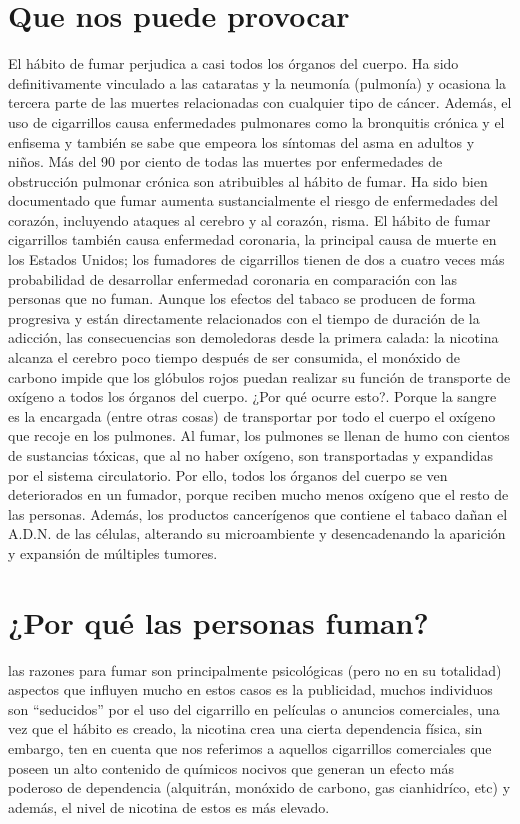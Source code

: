 \documentclass{bmcart}
\begin{document}
	\section*{Que nos puede provocar}
	El hábito de fumar perjudica a casi todos los órganos del cuerpo. Ha sido definitivamente vinculado a las cataratas y la neumonía (pulmonía) y ocasiona la tercera parte de las muertes relacionadas con cualquier tipo de cáncer. Además, el uso de cigarrillos causa enfermedades pulmonares como la bronquitis crónica y el enfisema y también se sabe que empeora los síntomas del asma en adultos y niños. Más del 90 por ciento de todas las muertes por enfermedades de obstrucción pulmonar crónica son atribuibles al hábito de fumar. Ha sido bien documentado que fumar aumenta sustancialmente el riesgo de enfermedades del corazón, incluyendo ataques al cerebro y al corazón, risma. El hábito de fumar cigarrillos también causa enfermedad coronaria, la principal causa de muerte en los Estados Unidos; los fumadores de cigarrillos tienen de dos a cuatro veces más probabilidad de desarrollar enfermedad coronaria en comparación con las personas que no fuman. Aunque los efectos del tabaco se producen de forma progresiva y están directamente relacionados con el tiempo de duración de la adicción, las consecuencias son demoledoras desde la primera calada: la nicotina alcanza el cerebro poco tiempo después de ser consumida, el monóxido de carbono impide que los glóbulos rojos puedan realizar su función de transporte de oxígeno a todos los órganos del cuerpo. ¿Por qué ocurre esto?. Porque la sangre es la encargada (entre otras cosas) de transportar por todo el cuerpo el oxígeno que recoje en los pulmones. Al fumar, los pulmones se llenan de humo con cientos de sustancias tóxicas, que al no haber oxígeno, son transportadas y expandidas por el sistema circulatorio. Por ello, todos los órganos del cuerpo se ven deteriorados en un fumador, porque reciben mucho menos oxígeno que el resto de las personas.
	Además, los productos cancerígenos que contiene el tabaco dañan el A.D.N. de las células, alterando su microambiente y desencadenando la aparición y expansión de múltiples tumores.
	
	\section*{¿Por qué las personas fuman?}
	las razones para fumar son principalmente psicológicas (pero no en su totalidad) aspectos que influyen mucho en estos casos es la publicidad, muchos individuos son “seducidos” por el uso del cigarrillo en películas o anuncios comerciales, una vez que el hábito es creado, la nicotina crea una cierta dependencia física, sin embargo, ten en cuenta que nos referimos a aquellos cigarrillos comerciales que poseen un alto contenido de químicos nocivos que generan un efecto más poderoso de dependencia (alquitrán, monóxido de carbono, gas cianhidríco, etc) y además, el nivel de nicotina de estos es más elevado.
	
\end{document}
